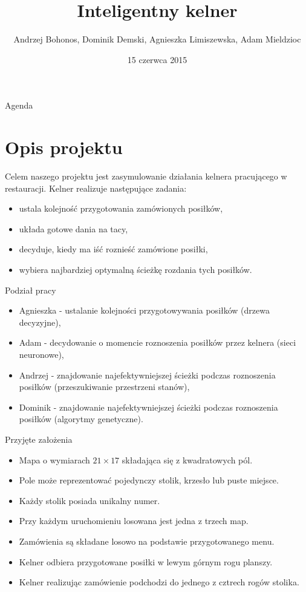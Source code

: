 \documentclass[a4paper,10pt]{beamer}
\date{15 czerwca 2015}
\title{Inteligentny kelner}
\author[A. Bohonos, D. Demski, A. Limiszewska, A. Mieldzioc]{Andrzej Bohonos, Dominik Demski, Agnieszka Limiszewska, Adam Mieldzioc}
\begin{document}
		\begin{frame}
			\titlepage
		\end{frame}
		\begin{frame}{Agenda}
			\tableofcontents
		\end{frame}
		
		\section{Opis projektu}
		\begin{frame}
			Celem naszego projektu jest zasymulowanie działania kelnera pracującego w restauracji. Kelner realizuje następujące zadania:
			\begin{itemize}
				\item ustala kolejność przygotowania zamówionych posiłków,
				\item układa gotowe dania na tacy, 
				\item decyduje, kiedy ma iść roznieść zamówione posiłki,
				\item wybiera najbardziej optymalną ścieżkę rozdania tych posiłków. 
			\end{itemize}
		\end{frame}
		\begin{frame}{Podział pracy}
			\begin{itemize}
				\item Agnieszka - ustalanie kolejności przygotowywania posiłków (drzewa decyzyjne),
				\item Adam - decydowanie o momencie roznoszenia posiłków przez kelnera (sieci neuronowe),
				\item Andrzej - znajdowanie najefektywniejszej ścieżki podczas roznoszenia posiłków (przeszukiwanie przestrzeni stanów),
				\item Dominik - znajdowanie najefektywniejszej ścieżki podczas roznoszenia posiłków (algorytmy genetyczne).
			\end{itemize}
		\end{frame}
		\begin{frame}{Przyjęte założenia}
			\begin{itemize}
				\item Mapa o wymiarach $21\times17$ składająca się z kwadratowych pól. 
				\item Pole może reprezentować pojedynczy stolik, krzesło lub puste miejsce.
				\item Każdy stolik posiada unikalny numer.
				\item Przy każdym uruchomieniu losowana jest jedna z trzech map.
				\item Zamówienia są składane losowo na podstawie przygotowanego menu.
				\item Kelner odbiera przygotowane posiłki w lewym górnym rogu planszy.
				\item Kelner realizując zamówienie podchodzi do jednego z cztrech rogów stolika.
				
			\end{itemize}
		\end{frame}
		
\end{document}

